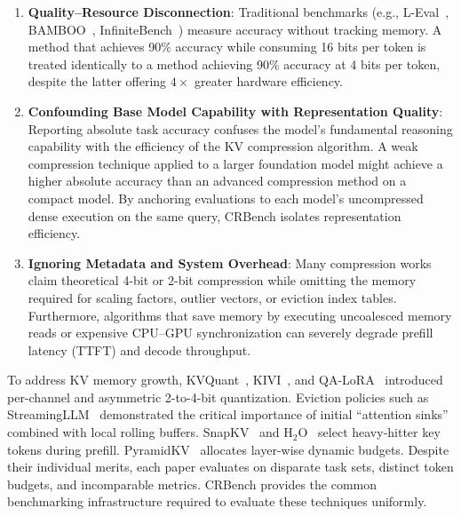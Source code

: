 \documentclass[11pt,a4paper]{article}
\begin{document}
\begin{enumerate}[leftmargin=*]
    \item \textbf{Quality--Resource Disconnection}: Traditional benchmarks (e.g., L-Eval~\cite{an2023leval}, BAMBOO~\cite{dong2023bamboo}, InfiniteBench~\cite{zhang2024infinitebench}) measure accuracy without tracking memory. A method that achieves 90\% accuracy while consuming 16 bits per token is treated identically to a method achieving 90\% accuracy at 4 bits per token, despite the latter offering $4\times$ greater hardware efficiency.
    \item \textbf{Confounding Base Model Capability with Representation Quality}: Reporting absolute task accuracy confuses the model's fundamental reasoning capability with the efficiency of the KV compression algorithm. A weak compression technique applied to a larger foundation model might achieve a higher absolute accuracy than an advanced compression method on a compact model. By anchoring evaluations to each model's uncompressed dense execution on the same query, CRBench isolates representation efficiency.
    \item \textbf{Ignoring Metadata and System Overhead}: Many compression works claim theoretical 4-bit or 2-bit compression while omitting the memory required for scaling factors, outlier vectors, or eviction index tables. Furthermore, algorithms that save memory by executing uncoalesced memory reads or expensive CPU--GPU synchronization can severely degrade prefill latency (TTFT) and decode throughput.
\end{enumerate}

To address KV memory growth, KVQuant~\cite{hooper2024kvquant}, KIVI~\cite{liu2024kivi}, and QA-LoRA~\cite{han2024qalora} introduced per-channel and asymmetric 2-to-4-bit quantization. Eviction policies such as StreamingLLM~\cite{xiao2023streamingllm} demonstrated the critical importance of initial ``attention sinks'' combined with local rolling buffers. SnapKV~\cite{li2024snapkv} and $\text{H}_2\text{O}$~\cite{zhang2023h2o} select heavy-hitter key tokens during prefill. PyramidKV~\cite{zhang2024pyramidkv} allocates layer-wise dynamic budgets. Despite their individual merits, each paper evaluates on disparate task sets, distinct token budgets, and incomparable metrics. CRBench provides the common benchmarking infrastructure required to evaluate these techniques uniformly.

\end{document}
